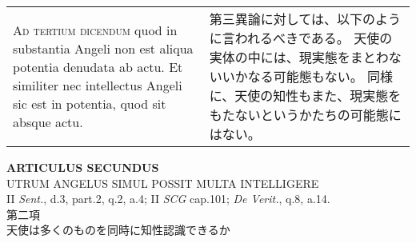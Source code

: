 \documentclass[10pt]{jsarticle} %
\begin{document}
\begin{longtable}{p{21em}p{21em}}
\\


{\scshape Ad tertium dicendum} quod in substantia Angeli
non est aliqua potentia denudata ab actu. Et similiter nec intellectus
Angeli sic est in potentia, quod sit absque actu.


&

第三異論に対しては、以下のように言われるべきである。
天使の実体の中には、現実態をまとわないいかなる可能態もない。
同様に、天使の知性もまた、現実態をもたないというかたちの可能態にはない。


\end{longtable}

\newpage


\begin{center}
 {\Large {\bf ARTICULUS SECUNDUS}}\\
 {\large UTRUM ANGELUS SIMUL POSSIT MULTA INTELLIGERE}\\
 {\footnotesize II {\itshape Sent.}, d.3, part.2, q.2, a.4; II {\itshape
 SCG} cap.101; {\itshape De Verit.}, q.8, a.14.}\\
 {\Large 第二項\\天使は多くのものを同時に知性認識できるか}
\end{center}
\end{document}
